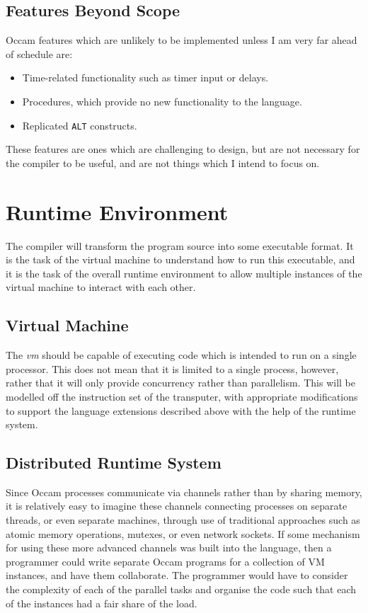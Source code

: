 \subsection{Features Beyond Scope}

Occam features which are unlikely to be implemented unless I am very far ahead
of schedule are:
\begin{itemize}
  \item Time-related functionality such as timer input or delays.
  \item Procedures, which provide no new functionality to the language.
  \item Replicated \texttt{ALT} constructs.
\end{itemize}
These features are ones which are challenging to design, but are not necessary
for the compiler to be useful, and are not things which I intend to focus on.

\section{Runtime Environment}

The compiler will transform the program source into some executable format. It
is the task of the virtual machine to understand how to run this executable, and
it is the task of the overall runtime environment to allow multiple instances of
the virtual machine to interact with each other.

\subsection{Virtual Machine} \label{vm}

The \textit{\gls{vm}} should be capable of executing code which is intended to
run on a single processor. This does not mean that it is limited to a single
process, however, rather that it will only provide concurrency rather than
parallelism. This will be modelled off the instruction set of the
\gls{transputer}, with appropriate modifications to support the language
extensions described above with the help of the runtime system.

\subsection{Distributed Runtime System} \label{dist-system}

Since Occam processes communicate via channels rather than by sharing memory, it
is relatively easy to imagine these channels connecting processes on separate
threads, or even separate machines, through use of traditional approaches such
as atomic memory operations, mutexes, or even network sockets. If some mechanism
for using these more advanced channels was built into the language, then a
programmer could write separate Occam programs for a collection of VM instances,
and have them collaborate. The programmer would have to consider the complexity
of each of the parallel tasks and organise the code such that each of the
instances had a fair share of the load.

